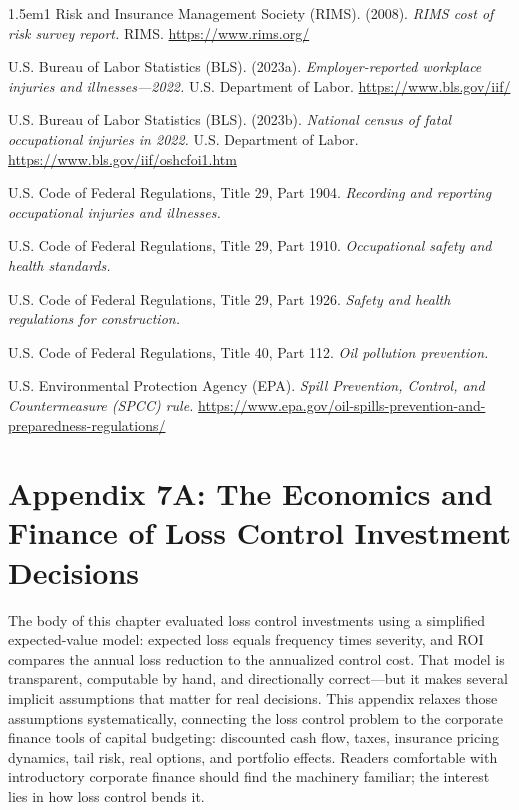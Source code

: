 \documentclass[11pt,openany]{book}
\begin{document}
\begin{hangparas}{1.5em}{1}
Risk and Insurance Management Society (RIMS). (2008). \emph{RIMS cost of risk
survey report.} RIMS. \url{https://www.rims.org/}

U.S. Bureau of Labor Statistics (BLS). (2023a). \emph{Employer-reported
workplace injuries and illnesses---2022.} U.S. Department of Labor.
\url{https://www.bls.gov/iif/}

U.S. Bureau of Labor Statistics (BLS). (2023b). \emph{National census of fatal
occupational injuries in 2022.} U.S. Department of Labor.
\url{https://www.bls.gov/iif/oshcfoi1.htm}

U.S. Code of Federal Regulations, Title 29, Part 1904. \emph{Recording and
reporting occupational injuries and illnesses.}

U.S. Code of Federal Regulations, Title 29, Part 1910. \emph{Occupational
safety and health standards.}

U.S. Code of Federal Regulations, Title 29, Part 1926. \emph{Safety and health
regulations for construction.}

U.S. Code of Federal Regulations, Title 40, Part 112. \emph{Oil pollution
prevention.}

U.S. Environmental Protection Agency (EPA). \emph{Spill Prevention, Control,
and Countermeasure (SPCC) rule.}
\url{https://www.epa.gov/oil-spills-prevention-and-preparedness-regulations/}

\end{hangparas}

\endgroup

\clearpage
\setcounter{section}{0}
\renewcommand{\thesection}{7A.\arabic{section}}
\renewcommand{\thesubsection}{\thesection.\arabic{subsection}}
\renewcommand{\theHsection}{appendix7A.\arabic{section}}
\renewcommand{\theHsubsection}{\theHsection.\arabic{subsection}}

\section*{Appendix 7A: The Economics and Finance of Loss Control Investment
Decisions}

The body of this chapter evaluated loss control investments using a simplified
expected-value model: expected loss equals frequency times severity, and ROI
compares the annual loss reduction to the annualized control cost. That model
is transparent, computable by hand, and directionally correct---but it makes
several implicit assumptions that matter for real decisions. This appendix
relaxes those assumptions systematically, connecting the loss control problem
to the corporate finance tools of capital budgeting: discounted cash flow,
taxes, insurance pricing dynamics, tail risk, real options, and portfolio
effects. Readers comfortable with introductory corporate finance should find
the machinery familiar; the interest lies in how loss control bends it.
\end{document}
